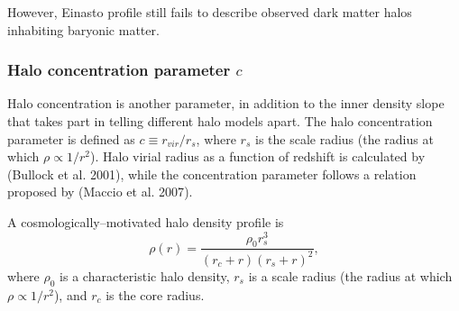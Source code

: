 \documentclass[paper=a4, fontsize=11pt]{scrartcl} %
\numberwithin{equation}{section} %
\numberwithin{figure}{section} %
\numberwithin{table}{section} %
\begin{document}
However, Einasto profile still fails to describe observed dark matter halos inhabiting baryonic matter.   

\subsubsection*{Halo concentration parameter $c$}
Halo concentration is another parameter, in addition to the inner density slope that takes part in telling different halo models apart. The halo concentration parameter is defined as $c \equiv r_{vir}/r_s$, where $r_s$ is the scale radius (the radius at which $\rho \propto 1/r^2$). Halo virial radius as a function of redshift is calculated by ({Bullock et al. 2001}), while the concentration parameter follows a relation proposed by ({Maccio et al. 2007}).

A cosmologically--motivated halo density profile is
\begin{equation}
\rho(r) = \frac{\rho_0 r_s^3}{(r_c + r)(r_s + r)^2},
\end{equation}
where $\rho_0$ is a characteristic halo density, $r_s$ is a scale radius (the radius at which $\rho \propto 1/r^2$), and $r_c$ is the core radius. 

\end{document}
